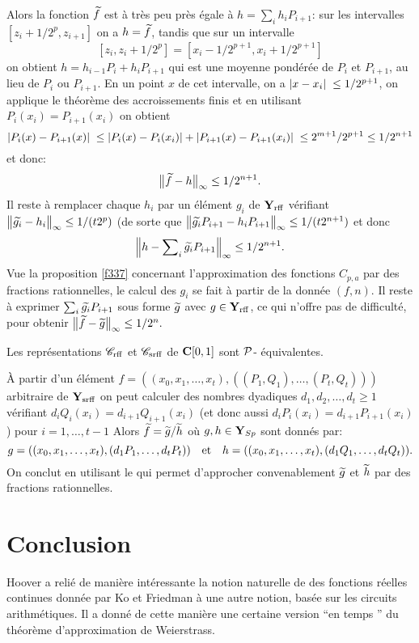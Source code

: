 \noindent Alors la fonction  $\widetilde{f}$ est à très peu près égale à  
$h=\sum_i h_iP_{i+1}$:  sur les intervalles  
$[z_i+1/2^p,z_{i+1}]$ on a   $h =\widetilde{f}$, 
tandis que sur un intervalle  
\[
[z_i, z_i +1/2^p] = [x_i - 1/2^{p+1}, x_i +1/2^{p+1}]
\]
on obtient  $h = h_{i-1}P_i + h_i P_{i+1}$  qui est une moyenne pondérée de  
$P_i$ et $P_{i+1}$,   au lieu de  $P_i$   ou  $P_{i+1}$. 
En un point $x$ de cet intervalle, on a  
$\left|{ x-x_i }\right|\;  \leq 1/2^{p+1}$, on applique le théorème des 
accroissements finis et en utilisant $P_i(x_i) =P_{i+1}(x_i)$  on obtient
\[
\left|{P_i(x) - P_{i+1}(x)}\right|\; \leq \left|{P_i(x) - P_i(x_i)}\right| + \left|{P_{i+1}(x) - P_{i+1}(x_i)}\right|\; \leq 2^{m+1}/2^{p+1} \leq 1/2^{n+1}
\]
et donc:
\[
\big\lVert  \widetilde{f} - h  \big\rVert_{\infty} \leq 1/2^{n+1}.
\]
Il reste à remplacer chaque  $h_i$  par un élément  $g_i$ de  ${{\bf Y}_{\rm rff}}$  
vérifiant   
$\big\lVert  \widetilde{g_i} - h_i  \big\rVert_{\infty} \leq 1/(t2^{p})$
 (de sorte que
$\big\lVert \widetilde{g_i}P_{i+1}-h_iP_{i+1} \big\rVert_{\infty}\leq 1/(t2^{n+1})$
et donc
\[
\Big\lVert  h - \sum\nolimits_i \widetilde{g_i}P_{i+1}  \Big\rVert_\infty \leq 1/2^{n+1}.
\]
Vue la proposition \ref{f337} concernant l'approximation des fonctions  $C_{p,a}$  
par des fractions rationnelles, le calcul des  $g_i$  se fait \etpo à partir 
de la donnée  $(f,n)$. Il reste à exprimer  
$\sum_i\widetilde{g_i}P_{i+1}$  
 sous forme $\widetilde{g}$   avec  $ g \in {{\bf Y}_{\rm rff}}$, ce qui n'offre pas de 
difficulté, pour obtenir  
$\big\lVert  \widetilde{f} - \widetilde{g}  \big\rVert_{\infty} \leq 1/2^n.$  
\eop

\begin{ftheorem} \label{f532}
Les représentations   ${{{\mathscr C}}_{\rm rff}}$  et   ${{{\mathscr C}}_{\rm srff}}$  de  ${{\bf C}[0,1]}$  sont ${\cal P}$-
équivalentes.
\end{ftheorem}
\proof
À partir d'un élément  
$f=((x_0,x_1,\ldots,x_t),((P_1,Q_1),\ldots,(P_t,Q_t)))$  arbitraire de  ${{\bf Y}_{\rm srff}}$  
on peut calculer \etpo des nombres dyadiques $d_1, d_2,\ldots,d_t \geq 1$   
vérifiant   
$d_iQ_i(x_i) = d_{i+1}Q_{i+1}(x_i)$  (et donc aussi  $d_iP_i(x_i) = 
d_{i+1}P_{i+1}(x_i)$)  pour  $i = 1, \ldots, t-1$ 
Alors  $\widetilde{f} = \widetilde{g} / \widetilde{h}$    où  
$g,h \in {\bf Y}_{Sp}$  sont donnés par:
\[
g = ((x_0,x_1,\ldots,x_t),(d_1P_1,\ldots,d_tP_t)) \quad  \hbox{et} \quad  h = ((x_0,x_1,\ldots,x_t),(d_1Q_1,\ldots,d_tQ_t)).
\]
On conclut en utilisant le  qui permet d'approcher 
convenablement  $\widetilde g$  et $\widetilde h$ par des fractions rationnelles.  \eop 



\section*{Conclusion}\label{fsec Conclusion}
Hoover a relié de manière intéressante la notion naturelle de \com des 
fonctions réelles continues donnée par Ko et Friedman à une autre notion, 
basée sur les circuits arithmétiques. Il a donné de cette manière une 
certaine version ``en temps \poll'' du théorème d'approximation de 
Weierstrass. 

